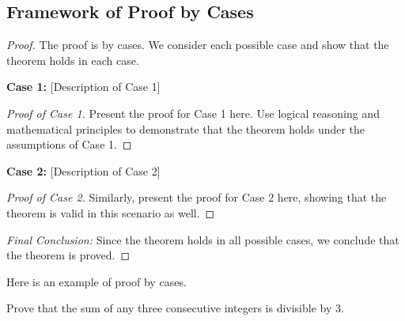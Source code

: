 \documentclass[
	12pt, %
	fleqn, %
	a4paper, %
]{LegrandOrangeBook}
\begin{document}
    \subsection*{Framework of Proof by Cases}
        \begin{proof}
        The proof is by cases. We consider each possible case and show that the theorem holds in each case.
        
        \textbf{Case 1:} [Description of Case 1]
        \begin{proof}[Proof of Case 1]
        Present the proof for Case 1 here. Use logical reasoning and mathematical principles to demonstrate that the theorem holds under the assumptions of Case 1.
        \end{proof}
        
        \textbf{Case 2:} [Description of Case 2]
        \begin{proof}[Proof of Case 2]
        Similarly, present the proof for Case 2 here, showing that the theorem is valid in this scenario as well.
        \end{proof}


\textit{Final Conclusion:} Since the theorem holds in all possible cases, we conclude that the theorem is proved.
\end{proof}

    Here is an example of proof by cases.
    \begin{example}
        
            Prove that the sum of any three consecutive integers is divisible by 3.
            
    \end{example}
\end{document}
